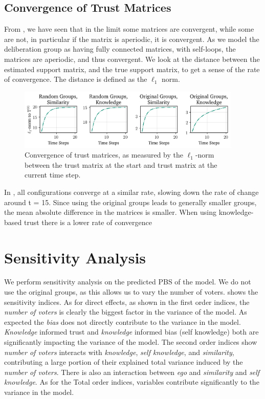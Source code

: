\subsection{Convergence of Trust Matrices}

From , we have seen that in the limit some matrices are
convergent, while some are not, in particular if the matrix is aperiodic, it
is convergent. As we model the deliberation group as having fully connected
matrices, with self-loops, the matrices are aperiodic, and thus convergent. We look at the
distance between the estimated support matrix, and the true support matrix, to
get a sense of the rate of convergence. The distance is defined as the
$\ell_1$ norm.

\begin{figure}[ht]
	\begin{center}
		\includegraphics[width=0.95\textwidth]{Figures/convergence_groups.png}
	\end{center}
	\caption{Convergence of trust matrices, as measured by the $\ell_1$-norm between the trust matrix at the start and  trust matrix at the current time step.}\label{fig:convergence_big}
\end{figure}

In , all configurations converge at a
similar rate, slowing down the rate of change around t = 15. Since using the
original groups leads to generally smaller groups, the mean absolute difference in
the matrices is smaller. When using knowledge-based trust there is a lower rate
of convergence




\section{Sensitivity Analysis} We perform sensitivity analysis on the predicted
PBS of the model. We do not use the original groups, as this allows us to vary
the number of voters.  shows the sensitivity indices.
As for direct effects, as shown in the first order indices, the \textit{number
	of voters} is clearly the biggest factor in the variance of the model. As
expected the \textit{bias} does not directly contribute to the variance in the
model. \textit{Knowledge} informed trust and\textit{ knowledge} informed bias
(self knowledge) both are significantly impacting the variance of the model.
The second order indices show \textit{number of voters} interacts with
\textit{knowledge}, \textit{self knowledge}, and\textit{ similarity},
contributing a large portion of their explained total variance induced by the
\textit{number of voters}. There is also an interaction between \textit{ego}
and \textit{similarity} and \textit{self knowledge}. As for the Total order
indices, variables contribute significantly to the variance in the
model.

